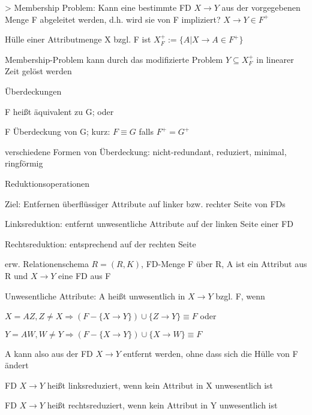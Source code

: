 \documentclass[a4paper]{article}
\begin{document}
\begin{multicols}{3}
> Membership Problem: Kann eine bestimmte FD $X\rightarrow Y$ aus der vorgegebenen Menge F abgeleitet werden, d.h. wird sie von F impliziert? $X\rightarrow Y \in F^+$
\begin{itemize*}
    \item Hülle einer Attributmenge X bzgl. F ist $X^+_F := \{A | X\rightarrow A \in F^+\}$
    \item Membership-Problem kann durch das modifizierte Problem $Y\subseteq X_F^+$ in linearer Zeit gelöst werden
\end{itemize*}

Überdeckungen
\begin{itemize*}
    \item F heißt äquivalent zu G; oder
    \item F Überdeckung von G; kurz: $F\equiv G$ falls $F^+=G^+$
    \item verschiedene Formen von Überdeckung: nicht-redundant, reduziert, minimal, ringförmig
\end{itemize*}

Reduktionsoperationen
\begin{itemize*}
    \item Ziel: Entfernen überflüssiger Attribute auf linker bzw. rechter Seite von FDs
    \item Linksreduktion: entfernt unwesentliche Attribute auf der linken Seite einer FD
    \item Rechtsreduktion: entsprechend auf der rechten Seite
    \item erw. Relationenschema $R = (R, K)$, FD-Menge F über R, A ist ein Attribut aus R und $X\rightarrow Y$ eine FD aus F
\end{itemize*}

Unwesentliche Attribute: A heißt unwesentlich in $X\rightarrow Y$ bzgl. F, wenn
\begin{itemize*}
    \item $X=AZ,Z\not= X \Rightarrow (F-\{X\rightarrow Y\})\cup \{Z\rightarrow Y\} \equiv F$ oder
    \item $Y=AW, W\not=Y\Rightarrow (F-\{X\rightarrow Y\})\cup \{X\rightarrow W\} \equiv F$
\end{itemize*}
\begin{itemize*}
    \item A kann also aus der FD $X\rightarrow Y$ entfernt werden, ohne dass sich die Hülle von F ändert
    \item FD $X\rightarrow Y$ heißt linksreduziert, wenn kein Attribut in X unwesentlich ist
    \item FD $X\rightarrow Y$ heißt rechtsreduziert, wenn kein Attribut in Y unwesentlich ist
\end{itemize*}


\end{multicols}
\end{document}
